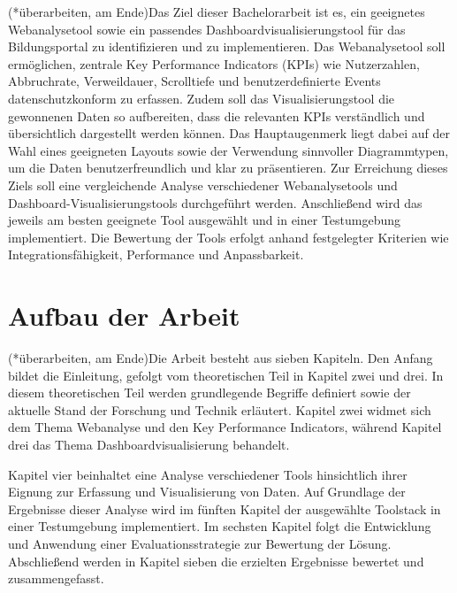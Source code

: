 (*überarbeiten, am Ende)Das Ziel dieser Bachelorarbeit ist es, ein geeignetes Webanalysetool sowie ein passendes Dashboardvisualisierungstool für das Bildungsportal zu identifizieren und zu implementieren. Das Webanalysetool soll ermöglichen, zentrale Key Performance Indicators (KPIs) wie Nutzerzahlen, Abbruchrate, Verweildauer, Scrolltiefe und benutzerdefinierte Events datenschutzkonform zu erfassen. Zudem soll das Visualisierungstool die gewonnenen Daten so aufbereiten, dass die relevanten KPIs verständlich und übersichtlich dargestellt werden können. Das Hauptaugenmerk liegt dabei auf der Wahl eines geeigneten Layouts sowie der Verwendung sinnvoller Diagrammtypen, um die Daten benutzerfreundlich und klar zu präsentieren.
Zur Erreichung dieses Ziels soll eine vergleichende Analyse verschiedener Webanalysetools und Dashboard-Visualisierungstools durchgeführt werden. Anschließend wird das jeweils am besten geeignete Tool ausgewählt und in einer Testumgebung implementiert. Die Bewertung der Tools erfolgt anhand festgelegter Kriterien wie Integrationsfähigkeit, Performance und Anpassbarkeit.

\section{Aufbau der Arbeit}
\label{sec:aufbau}
(*überarbeiten, am Ende)Die Arbeit besteht aus sieben Kapiteln. Den Anfang bildet die Einleitung, gefolgt vom theoretischen Teil in Kapitel zwei und drei. In diesem theoretischen Teil werden grundlegende Begriffe definiert sowie der aktuelle Stand der Forschung und Technik erläutert. Kapitel zwei widmet sich dem Thema Webanalyse und den Key Performance Indicators, während Kapitel drei das Thema Dashboardvisualisierung behandelt.

Kapitel vier beinhaltet eine Analyse verschiedener Tools hinsichtlich ihrer Eignung zur Erfassung und Visualisierung von Daten. Auf Grundlage der Ergebnisse dieser Analyse wird im fünften Kapitel der ausgewählte Toolstack in einer Testumgebung implementiert. Im sechsten Kapitel folgt die Entwicklung und Anwendung einer Evaluationsstrategie zur Bewertung der Lösung. Abschließend werden in Kapitel sieben die erzielten Ergebnisse bewertet und zusammengefasst.